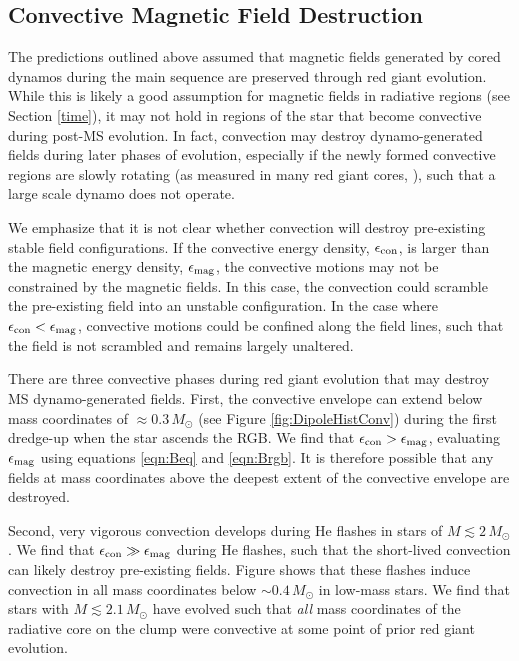 \subsection{Convective Magnetic Field Destruction}

The predictions outlined above assumed that magnetic fields generated by cored dynamos during the main sequence are preserved through red giant evolution. While this is likely a good assumption for magnetic fields in radiative regions (see Section \ref{time}), it may not hold in regions of the star that become convective during post-MS evolution. In fact, convection may destroy dynamo-generated fields during later phases of evolution, especially if the newly formed convective regions are slowly rotating (as measured in many red giant cores, \cite{Mosser_2012}), such that a large scale dynamo does not operate.

We emphasize that it is not clear whether convection will destroy pre-existing stable field configurations. If the convective energy density, $\epsilon_{\rm con}$, is larger than the magnetic energy density, $\epsilon_{\rm mag}$, the convective motions may not be constrained by the magnetic fields. In this case, the convection could scramble the pre-existing field into an unstable configuration. In the case where $\epsilon_{\rm con} < \epsilon_{\rm mag}$, convective motions could be confined along the field lines, such that the field is not scrambled and remains largely unaltered.

There are three convective phases during red giant evolution that may destroy MS dynamo-generated fields. First, the convective envelope can extend below mass coordinates of $\approx 0.3 \, M_\odot$ (see Figure \ref{fig:DipoleHistConv}) during the first dredge-up when the star ascends the RGB. We find that $\epsilon_{\rm con} > \epsilon_{\rm mag}$, evaluating $\epsilon_{\rm mag}$ using equations \ref{eqn:Beq} and \ref{eqn:Brgb}. It is therefore possible that any fields at mass coordinates above the deepest extent of the convective envelope are destroyed.

Second, very vigorous convection develops during He flashes in stars of $M \lesssim 2 \, M_\odot$. We find that $\epsilon_{\rm con} \gg \epsilon_{\rm mag}$ during He flashes, such that the short-lived convection can likely destroy pre-existing fields. Figure \label{fig:DipoleHistConv} shows that these flashes induce convection in all mass coordinates below $ \sim \! 0.4 \, M_\odot$ in low-mass stars. We find that stars with $M \lesssim 2.1 \, M_\odot$ have evolved such that {\it all} mass coordinates  of the radiative core on the clump were convective at some point of prior red giant evolution. 

